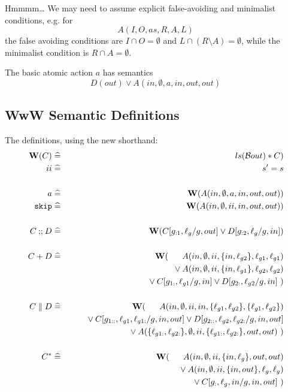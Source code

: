 Hmmmm\dots
We may need to assume explicit false-avoiding and minimalist conditions,
e.g. for
\[
   A(I,O,as,R,A,L)
\]
the false avoiding conditions are
$I \cap O = \emptyset$
and $L \cap (R \setminus A) = \emptyset$,
while the minimalist condition is $R \cap A = \emptyset$.

The basic atomic action $a$ has semantics
\[
  D(out) \lor A(in,\emptyset,a,in,out,out)
\]

\subsection{WwW Semantic Definitions}
The definitions, using the new shorthand:
\begin{eqnarray*}
   \W(C) &\defs& ls(\B{out}) * C)
\\ ii &\defs& s'=s
\\
\\ a &\defs&\W(A(in,\emptyset,a,in,out,out))
\\ \cskip
   &\defs&
   \W(A(in,\emptyset,ii,in,out,out))
\\
\\ C \cseq D
   &\defs&
   \W(C[g_{:1},\ell_g/g,out] \lor D[g_{:2},\ell_g/g,in])
\\
\\ C + D
   &\defs&
   \W(\quad {}\phlor A(in,\emptyset,ii,\setof{in,\ell_{g2}},\ell_{g1},\ell_{g1})
\\ && \qquad {} \lor
   A(in,\emptyset,ii,\setof{in,\ell_{g1}},\ell_{g2},\ell_{g2})
\\ && \qquad {} \lor
   C[g_{1:},\ell_{g1}/g,in] \lor D[g_{2:},\ell_{g2}/g,in]~)
\\
\\ C \parallel D
   &\defs&
   \W(\quad\phlor A(in,\emptyset,ii,in,\setof{\ell_{g1},\ell_{g2}},\setof{\ell_{g1},\ell_{g2}})
\\ && \qquad {}\lor
   C[g_{1::},\ell_{g1},\ell_{g1:}/g,in,out]
   \lor D[g_{2::},\ell_{g2},\ell_{g2:}/g,in,out]
\\ && \qquad {}\lor
   A(\setof{\ell_{g1:},\ell_{g2:}},\emptyset
      ,ii
      ,\setof{\ell_{g1:},\ell_{g2:}},out,out)~)
\\
\\ C^*
   &\defs&
   \W(\quad\phlor A(in,\emptyset,ii,\setof{in,\ell_g},out,out)
\\ && \qquad {}\lor A(in,\emptyset,ii,\setof{in,out},\ell_g,\ell_g)
\\ && \qquad {}\lor C[g_{:},\ell_g,in/g,in,out]~)
\end{eqnarray*}
